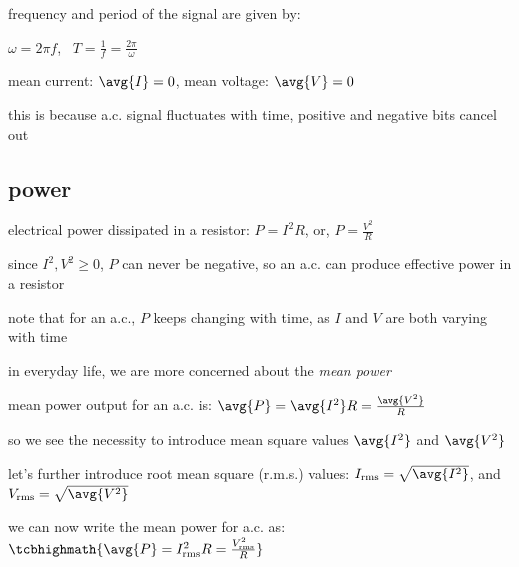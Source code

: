 frequency and period of the signal are given by:

{

\centering

$\omega = 2 \pi f$, $\,$ $T = \frac{1}{f} = \frac{2\pi}{\omega} $

}

\cmt mean current: $\avg{I} = 0$, mean voltage: $\avg{V}=0$

this is because a.c. signal fluctuates with time, positive and negative bits cancel out

\newpage







\subsection{power}

electrical power dissipated in a resistor: $P = I^2 R$, or, $P=\frac{V^2}{R}$

since $I^2, V^2 \geq 0$, $P$ can never be negative, so an a.c. can produce effective power in a resistor

note that for an a.c., $P$ keeps changing with time, as $I$ and $V$ are both varying with time

in everyday life, we are more concerned about the \emph{mean power}

mean power output for an a.c. is: $\avg{P} = \avg{I^2} R = \frac{\avg{V^2}}{R}$

so we see the necessity to introduce mean square values $\avg{I^2}$  and $\avg{V^2}$

let's further introduce root mean square (r.m.s.) values: $I_\text{rms} = \sqrt{\avg{I^2}}$, and $V_\text{rms} = \sqrt{\avg{V^2}}$

we can now write the mean power for a.c. as: $\tcbhighmath{\avg{P} = I^2_\text{rms} R = \frac{V^2_\text{rms}}{R}}$

